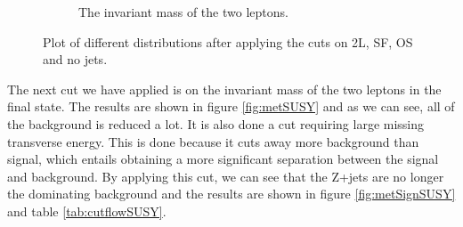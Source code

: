 \begin{figure}[H]
\begin{subfigure}[t!]{0.49\textwidth}
    \caption{The invariant mass of the two leptons.}
    \label{fig:mllSUSY}
    \end{subfigure}
    \caption{Plot of different distributions after applying the cuts on 2L, SF, OS and no jets.}
    \label{fig:stepsSUSY1}
\end{figure}


The next cut we have applied is on the invariant mass of the two leptons in the final state. The results are shown in figure \ref{fig:metSUSY} and as we can see, all of the background is reduced a lot. It is also done a cut requiring large missing transverse energy. This is done because it cuts away more background than signal, which entails obtaining a more significant separation between the signal and background. By applying this cut, we can see that the Z+jets are no longer the dominating background and the results are shown in figure \ref{fig:metSignSUSY} and table \ref{tab:cutflowSUSY}. 

